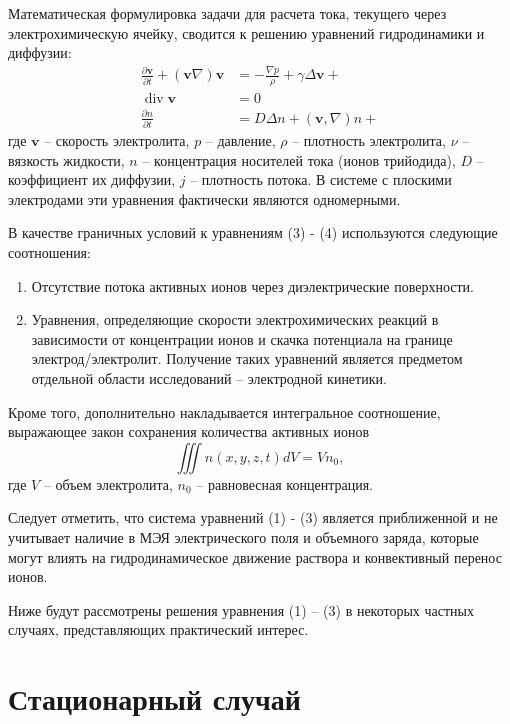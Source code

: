 \documentclass[12pt, a4paper]{article}
\begin{document}
Математическая формулировка задачи для расчета тока, текущего через электрохимическую ячейку, сводится к решению уравнений гидродинамики и диффузии:
\begin{align}
    \frac{\partial \mathbf{v}}{\partial t} + (\mathbf{v}\nabla)\mathbf{v} &= -\frac{\nabla p}{\rho} + \gamma\Delta\mathbf{v} + \label{eq:1} \\
    \operatorname{div} \mathbf{v} &= 0 \label{eq:2} \\
    \frac{\partial n}{\partial t} &= D\Delta n + (\mathbf{v}, \nabla)n + \label{eq:3}
\end{align}
где $\mathbf{v}$ -- скорость электролита, $p$ -- давление, $\rho$ -- плотность электролита, $\nu$ -- вязкость жидкости, $n$ -- концентрация носителей тока (ионов трийодида), $D$ -- коэффициент их диффузии, $j$ -- плотность потока. В системе с плоскими электродами эти уравнения фактически являются одномерными.

В качестве граничных условий к уравнениям (3) - (4) используются следующие соотношения:
\begin{enumerate}
    \item Отсутствие потока активных ионов через диэлектрические поверхности.
    \item Уравнения, определяющие скорости электрохимических реакций в зависимости от концентрации ионов и скачка потенциала на границе электрод/электролит. Получение таких уравнений является предметом отдельной области исследований -- электродной кинетики.
\end{enumerate}

Кроме того, дополнительно накладывается интегральное соотношение, выражающее закон сохранения количества активных ионов
\begin{equation}
\iiint n(x, y, z, t) dV = V n_0, \tag{4}
\end{equation}
где $V$ -- объем электролита, $n_0$ -- равновесная концентрация.

Следует отметить, что система уравнений (1) - (3) является приближенной и не учитывает наличие в МЭЯ электрического поля и объемного заряда, которые могут влиять на гидродинамическое движение раствора и конвективный перенос ионов.

Ниже будут рассмотрены решения уравнения (1) -- (3) в некоторых частных случаях, представляющих практический интерес.

\section*{Стационарный случай}
\end{document}
